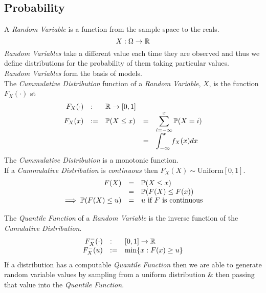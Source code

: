 \documentclass[11pt,a4paper]{article}
\begin{document}



\subsection{Probability}

A \textit{Random Variable} is a function from the sample space to the reals.
$$X:\Omega\to\mathbb{R}$$
\textit{Random Variables} take a different value each time they are observed and thus we define distributions for the probability of them taking particular values.\\
\textit{Random Variables} form the basis of models.\\

The \textit{Cummulative Distribution} function of a \textit{Random Variable}, $X$, is the function $F_X(\cdot)$ st
\[\begin{array}{rllrl}
F_X(\cdot)&:&\mathbb{R}\to[0,1]\\
F_X(x)&:=&\mathbb{P}(X\leq x)&=&\displaystyle\sum_{i=-\infty}^x\mathbb{P}(X=i)\\
&&&=&\displaystyle\int_{-\infty}^xf_X(x)dx
\end{array}\]
The \textit{Cummulative Distribution} is a monotonic function.\\

If a \textit{Cummulative Distribution} is \textit{continuous} then $F_X(X)\sim\text{Uniform}[0,1]$.\\

\[\begin{array}{rcl}
F(X)&=&\mathbb{P}(X\leq x)\\
&=&\mathbb{P}(F(X)\leq F(x))\\
\implies\mathbb{P}(F(X)\leq u)&=&u\text{ if $F$ is continuous}
\end{array}\]

The \textit{Quantile Function} of a \textit{Random Variable} is the inverse function of the \textit{Cumulative Distribution}.\\
\[\begin{array}{rll}
F^-_X(\cdot)&:&[0,1]\to\mathbb{R}\\
F^-_X(u)&:=&\min\{x:F(x)\geq u\}
\end{array}\]
If a distribution has a computable \textit{Quantile Function} then we are able to generate random variable values by sampling from a uniform distribution \& then passing that value into the \textit{Quantile Function}.\\
\end{document}
